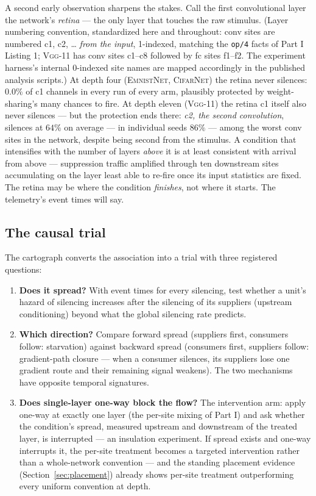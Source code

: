 \documentclass[11pt]{article}
\newcommand{\modelEmnistNet}{\textsc{EmnistNet}\xspace}
\newcommand{\modelCifarNet}{\textsc{CifarNet}\xspace}
\newcommand{\modelVggEleven}{\textsc{Vgg-11}\xspace}
\begin{document}
A second early observation sharpens the stakes. Call the first
convolutional layer the network's \emph{retina} --- the only layer
that touches the raw stimulus. (Layer numbering convention,
standardized here and throughout: conv sites are numbered
c1, c2, \ldots{} \emph{from the input}, 1-indexed, matching the
\texttt{op/4} facts of Part I Listing 1; \modelVggEleven{} has
conv sites c1--c8 followed by fc sites f1--f2. The experiment
harness's internal 0-indexed site names are mapped accordingly in
the published analysis scripts.) At depth four (\modelEmnistNet{},
\modelCifarNet{}) the retina never silences: $0.0\%$ of c1
channels in every run of every arm, plausibly protected by
weight-sharing's many chances to fire. At depth eleven
(\modelVggEleven{}) the retina c1 itself also never silences ---
but the protection ends there: \emph{c2, the second convolution},
silences at $64\%$ on average --- in individual seeds $86\%$ ---
among the worst conv sites in the network, despite being second
from the stimulus. A condition that intensifies with the
number of layers \emph{above} it is at least consistent with
arrival from above --- suppression traffic amplified through ten
downstream sites accumulating on the layer least able to re-fire
once its input statistics are fixed. The retina may be where the
condition \emph{finishes}, not where it starts. The telemetry's
event times will say.

\subsection{The causal trial}
\label{sec:causal}

The cartograph converts the association into a trial with three
registered questions:

\begin{enumerate}
\item \textbf{Does it spread?} With event times for every silencing,
test whether a unit's hazard of silencing increases after the
silencing of its suppliers (upstream conditioning) beyond what the
global silencing rate predicts.
\item \textbf{Which direction?} Compare forward spread (suppliers
first, consumers follow: starvation) against backward spread
(consumers first, suppliers follow: gradient-path closure --- when a
consumer silences, its suppliers lose one gradient route and their
remaining signal weakens). The two mechanisms have opposite
temporal signatures.
\item \textbf{Does single-layer one-way block the flow?} The
intervention arm: apply one-way at exactly one layer (the per-site
mixing of Part I) and ask whether the condition's spread, measured
upstream and downstream of the treated layer, is interrupted --- an
insulation experiment. If spread exists and one-way interrupts it,
the per-site treatment becomes a targeted intervention rather than a
whole-network convention --- and the standing placement evidence
(Section~\ref{sec:placement}) already shows per-site treatment
outperforming every uniform convention at depth.
\end{enumerate}
\end{document}
